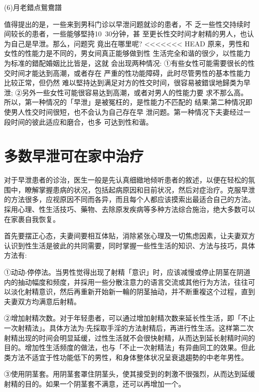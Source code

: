 \documentclass[12pt,UTF8]{ctexbook}
\begin{document}
(6)月老錯点鴛鴦譜

值得提出的是，一些来到男科门诊以早泄问题就诊的患者，不
乏一些性交持续时间较长的患者，一些能够堅持10~30分钟，甚
至更长性交时间才射精的男人，也认为自己是早泄。那么，问题究
竟出在哪里呢?
<<<<<<< HEAD
原来，男性和女性的性能力是不同的，男女间真正能够做到性
生活完全和谐的很少，以性能力为标准的錯配婚姻比比皆是，这就
会出现两种情况:
①有些女性可能需要很长的性交时间才能达到高潮，或者存在
严重的性功能障碍，此时尽管男性的基本性能力比较正常，但仍然
难以堅持达到满足对方的性交时间，很容易被錯误地歸类为早泄;
②另外一些女性可能很容易达到高潮，或者对男人的性能力要
求不那么高。
所以，第一种情况的「早泄」是被冤枉的，是性能力不匹配的
结果;第二种情况即使男人性交时间很短，也不会认为自己存在早
泄问题。第一种情况下夫妻经过一段时间的彼此适应和磨合，也多
可达到性和谐。

\section{多数早泄可在家中治疗}

对于早泄患者的诊治，医生一般是先认真细緻地倾听患者的敘述，以便在轻松的氛围中，瞭解掌握患病的状况，包括起病原因和目前状况，然后对症治疗。克服早泄的方法很多，应视原因不同而各异，而且每个人都应该摸索出最适合自己的方法。採用心理、性生活技巧、藥物、去除原发疾病等多种方法综合施治，绝大多数可以在家裹自我恢复。

首先要摆正心态，夫妻间要相互体贴，消除紧张心理及一切焦虑因素，让夫妻双方认识到性生活是彼此的共同需要，同时掌握一些性生活的知识、方法与技巧，具体方法有:

①动动-停停法。当男性觉得出现了射精「意识」时，应该减慢或停止阴茎在阴道内的抽动幅度和频度，并採用一些分散注意力的语言交流或其他行为方法，往往可以淡化射精意识，然后再重新开始新一輪的阴茎抽动，并不断重複这个过程，直到夫妻双方均满意后射精。

②增加射精次数。对于年轻患者，可以通过增加射精次数来延长性生活，即「不止一次射精法」。具体方法为:先採取手淫的方法射精后，再进行性生活。这样第二次射精出现的时间会明显延缓，过性生活就不会很快射精，从而达到延长射精时间的目的。增加性生活频度的做法，也与「不止一次射精法」有异曲同工的效果。但此类方法不适宜于性功能低下的男性，和身体整体状况呈衰退趨勢的中老年男性。

③使用阴茎套。用阴茎套罩住阴茎头，使其接受到的刺激不很强烈，从而达到延缓射精的目的。如果一个阴茎套不满意，还可以再增加一个。
\end{document}
